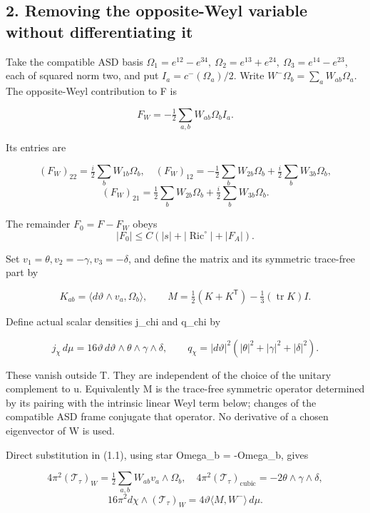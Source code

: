 \documentclass[
  10pt,
]{article}
\begin{document}
\hypertarget{removing-the-opposite-weyl-variable-without-differentiating-it}{%
\subsection{2. Removing the opposite-Weyl variable without
differentiating
it}\label{removing-the-opposite-weyl-variable-without-differentiating-it}}

Take the compatible ASD basis \(\Omega_1=e^{12}-e^{34},\
\Omega_2=e^{13}+e^{24},\
\Omega_3=e^{14}-e^{23}\), each of squared norm two, and put
\(I_a=c^-(\Omega_a)/2\). Write \(W^-\Omega_b=\sum_a W_{ab}\Omega_a\).
The opposite-Weyl contribution to F is

\[
 F_W=-\tfrac12\sum_{a,b}W_{ab}\Omega_b I_a.
\]

Its entries are

\[
 (F_W)_{22}=\tfrac i2\sum_bW_{1b}\Omega_b,\quad
 (F_W)_{12}=-\tfrac12\sum_bW_{2b}\Omega_b
                         +\tfrac i2\sum_bW_{3b}\Omega_b,
\] \[
 (F_W)_{21}=\tfrac12\sum_bW_{2b}\Omega_b
                         +\tfrac i2\sum_bW_{3b}\Omega_b.
\]

The remainder \(F_0=F-F_W\) obeys \[
 |F_0|\le C(|s|+|\operatorname{Ric}^{\circ}|+|F_A|).
\]

Set \(v_1=\theta,v_2=-\gamma,v_3=-\delta\), and define the matrix and
its symmetric trace-free part by

\[
 K_{ab}=\langle d\vartheta\wedge v_a,\Omega_b\rangle,\qquad
 M=\tfrac12(K+K^{\mathsf T})-\tfrac13(\operatorname{tr}K)I.
\]

Define actual scalar densities j\_chi and q\_chi by

\[
 j_\chi\,d\mu=16\vartheta\,d\vartheta\wedge\theta\wedge\gamma\wedge\delta,
 \qquad
 q_\chi=|d\vartheta|^2(|\theta|^2+|\gamma|^2+|\delta|^2).
\]

These vanish outside T. They are independent of the choice of the
unitary complement to u. Equivalently M is the trace-free symmetric
operator determined by its pairing with the intrinsic linear Weyl term
below; changes of the compatible ASD frame conjugate that operator. No
derivative of a chosen eigenvector of W is used.

Direct substitution in (1.1), using star Omega\_b = -Omega\_b, gives

\[
 4\pi^2(\mathcal T_\tau)_W
       =\tfrac12\sum_{a,b}W_{ab}v_a\wedge\Omega_b,\quad
 4\pi^2(\mathcal T_\tau)_{\mathrm{cubic}}
                                  =-2\theta\wedge\gamma\wedge\delta,
\] \[
 16\pi^2d\chi\wedge(\mathcal T_\tau)_W
                       =4\vartheta\langle M,W^-\rangle\,d\mu.
\]
\end{document}
